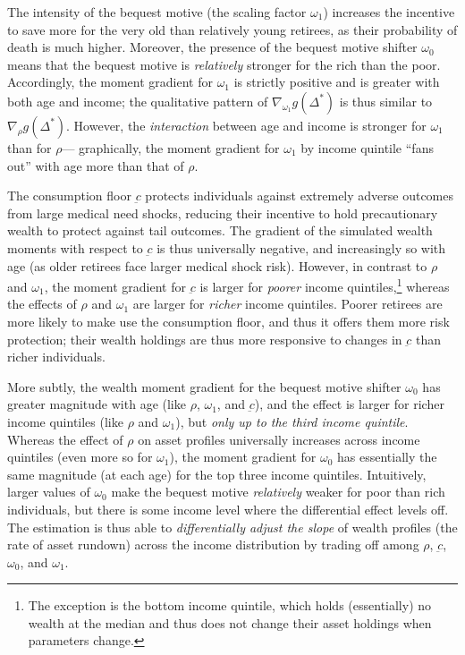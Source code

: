 \documentclass[12pt,pdftex,letterpaper]{article}
\newcommand{\Con}{c}
\newcommand{\ConFloor}{\underbar{\Con}}
\newcommand{\CRRAcon}{\rho}
\newcommand{\BequestParam}{\omega}
\begin{document}
The intensity of the bequest motive (the scaling factor $\BequestParam_1$) increases the incentive to save more for the very old than relatively young retirees, as their probability of death is much higher.  Moreover, the presence of the bequest motive shifter $\BequestParam_0$ means that the bequest motive is \textit{relatively} stronger for the rich than the poor.  Accordingly, the moment gradient for $\BequestParam_1$ is strictly positive and is greater with both age and income; the qualitative pattern of $\nabla_{\BequestParam_1} g(\Delta^*)$ is thus similar to $\nabla_{\CRRAcon} g(\Delta^*)$.  However, the \textit{interaction} between age and income is stronger for $\BequestParam_1$ than for $\CRRAcon$--- graphically, the moment gradient for $\BequestParam_1$ by income quintile ``fans out'' with age more than that of $\CRRAcon$.

The consumption floor $\ConFloor$ protects individuals against extremely adverse outcomes from large medical need shocks, reducing their incentive to hold precautionary wealth to protect against tail outcomes.  The gradient of the simulated wealth moments with respect to $\ConFloor$ is thus universally negative, and increasingly so with age (as older retirees face larger medical shock risk).  However, in contrast to $\CRRAcon$ and $\BequestParam_1$, the moment gradient for $\ConFloor$ is larger for \textit{poorer} income quintiles,\footnote{The exception is the bottom income quintile, which holds (essentially) no wealth at the median and thus does not change their asset holdings when parameters change.} whereas the effects of $\CRRAcon$ and $\BequestParam_1$ are larger for \textit{richer} income quintiles.  Poorer retirees are more likely to make use the consumption floor, and thus it offers them more risk protection; their wealth holdings are thus more responsive to changes in $\ConFloor$ than richer individuals.

More subtly, the wealth moment gradient for the bequest motive shifter $\BequestParam_0$ has greater magnitude with age (like $\CRRAcon$, $\BequestParam_1$, and $\ConFloor$), and the effect is larger for richer income quintiles (like $\CRRAcon$ and $\BequestParam_1$), but \textit{only up to the third income quintile}.  Whereas the effect of $\CRRAcon$ on asset profiles universally increases across income quintiles (even more so for $\BequestParam_1$), the moment gradient for $\BequestParam_0$ has essentially the same magnitude (at each age) for the top three income quintiles.  Intuitively, larger values of $\BequestParam_0$ make the bequest motive \textit{relatively} weaker for poor than rich individuals, but there is some income level where the differential effect levels off.  The estimation is thus able to \textit{differentially adjust the slope} of wealth profiles (the rate of asset rundown) across the income distribution by trading off among $\CRRAcon$, $\ConFloor$, $\BequestParam_0$, and $\BequestParam_1$.
\end{document}
